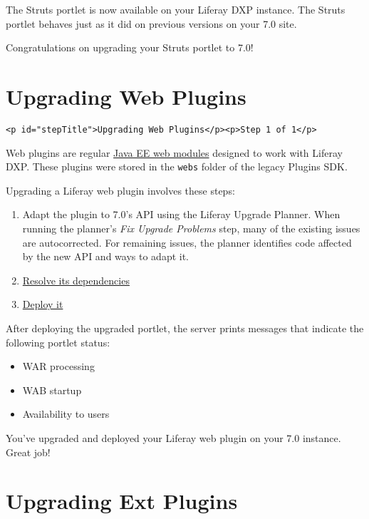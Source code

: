 The Struts portlet is now available on your Liferay DXP instance. The
Struts portlet behaves just as it did on previous versions on your 7.0
site.

Congratulations on upgrading your Struts portlet to 7.0!

\chapter{Upgrading Web Plugins}\label{upgrading-web-plugins}

\begin{verbatim}
<p id="stepTitle">Upgrading Web Plugins</p><p>Step 1 of 1</p>
\end{verbatim}

Web plugins are regular
\href{https://docs.oracle.com/cd/E19226-01/820-7627/bnadx/index.html}{Java
EE web modules} designed to work with Liferay DXP. These plugins were
stored in the \texttt{webs} folder of the legacy Plugins SDK.

Upgrading a Liferay web plugin involves these steps:

\begin{enumerate}
\def\labelenumi{\arabic{enumi}.}
\item
  Adapt the plugin to 7.0's API using the Liferay Upgrade Planner. When
  running the planner's \emph{Fix Upgrade Problems} step, many of the
  existing issues are autocorrected. For remaining issues, the planner
  identifies code affected by the new API and ways to adapt it.
\item
  \href{/docs/7-2/tutorials/-/knowledge_base/t/resolving-a-projects-dependencies}{Resolve
  its dependencies}
\item
  \href{/docs/7-2/reference/-/knowledge_base/r/deploying-a-project}{Deploy
  it}
\end{enumerate}

After deploying the upgraded portlet, the server prints messages that
indicate the following portlet status:

\begin{itemize}
\tightlist
\item
  WAR processing
\item
  WAB startup
\item
  Availability to users
\end{itemize}

You've upgraded and deployed your Liferay web plugin on your 7.0
instance. Great job!

\chapter{Upgrading Ext Plugins}\label{upgrading-ext-plugins}

